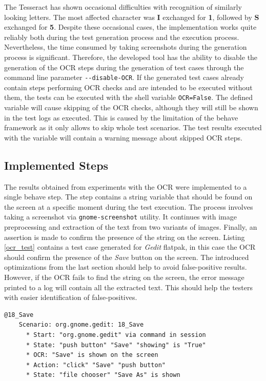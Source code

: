 The Tesseract has shown occasional difficulties with recognition of similarly looking letters. The most affected character was \textbf{I} exchanged for \textbf{1}, followed by \textbf{S} exchanged for \textbf{5}. Despite these occasional cases, the implementation works quite reliably both during the test generation process and the execution process. Nevertheless, the time consumed by taking screenshots during the generation process is significant. Therefore, the developed tool has the ability to disable the generation of the OCR steps during the generation of test cases through the command line parameter \texttt{-{}-disable-OCR}. If the generated test cases already contain steps performing OCR checks and are intended to be executed without them, the tests can be executed with the shell variable \texttt{OCR=False}. The defined variable will cause skipping of the OCR checks, although they will still be shown in the test logs as executed. This is caused by the limitation of the behave framework as it only allows to skip whole test scenarios. The test results executed with the variable will contain a warning message about skipped OCR steps.

\subsection{Implemented Steps}
The results obtained from experiments with the OCR were implemented to a single behave step. The step contains a string variable that should be found on the screen at a specific moment during the test execution. The process involves taking a screenshot via \texttt{gnome-screenshot} utility. It continues with image preprocessing and extraction of the text from two variants of images. Finally, an assertion is made to confirm the presence of the string on the screen. Listing \ref{ocr_test} contains a test case generated for \textit{Gedit} flatpak, in this case the OCR should confirm the presence of the \textit{Save} button on the screen. The introduced optimizations from the last section should help to avoid false-positive results. However, if the OCR fails to find the string on the screen, the error message printed to a log will contain all the extracted text. This should help the testers with easier identification of false-positives.

\begin{lstlisting}[language=Gherkin,caption={Test case demonstrating the OCR integration in test cases},label={ocr_test}]
    @18_Save
    Scenario: org.gnome.gedit: 18_Save
      * Start: "org.gnome.gedit" via command in session
      * State: "push button" "Save" "showing" is "True"
      * OCR: "Save" is shown on the screen
      * Action: "click" "Save" "push button"
      * State: "file chooser" "Save As" is shown
\end{lstlisting}


